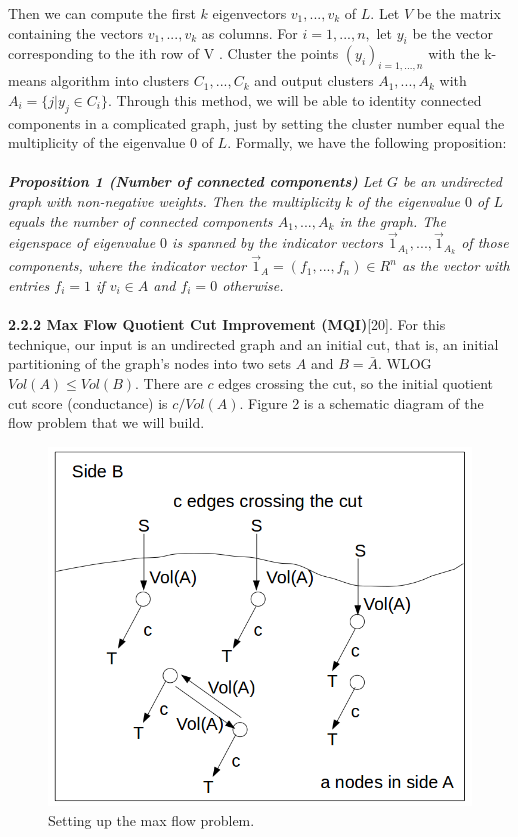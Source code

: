 \documentclass[12pt]{article}
\begin{document}
Then we can compute the first $k$ eigenvectors $v_1 , . . . , v_k$ of $L$. Let $V$
be the matrix containing the vectors $v_1 , . . . , v_k$ as columns. For $i=1, . . . ,n,$ let $y_i$ be the vector corresponding to the ith row of V . Cluster the points $(y_i)_{i=1,...,n}$ with the k-means algorithm into clusters $C_1 , . . . , C_k$ and output clusters $A_1 , . . . , A_k$ with $A_i = \{ j | y_j \in C_i \}$. Through this method, we will be able to identity connected components in a complicated graph, just by setting the cluster number equal the multiplicity of the eigenvalue $0$ of $L$. Formally, we have the following proposition:\\\\
\textit{\textbf{Proposition 1 (Number of connected components)} Let $G$ be an undirected graph with non-negative weights. Then the multiplicity $k$ of the eigenvalue $0$ of $L$ equals the number of connected components $A_1 ,..., A_k$ in the graph. The eigenspace of eigenvalue $0$ is spanned by the indicator vectors $\vec{1}_{A_1} ,...,\vec{1}_{A_k}$ of those components, where the indicator vector $\vec{1}_A = (f_1 ,..., f_n) \in R^n$ as the vector with entries $f_i = 1$ if $v_i \in A$ and $f_i = 0$ otherwise.}\\\\
\textbf{2.2.2 Max Flow Quotient Cut Improvement (MQI)}[20].
For this technique, our input is an undirected graph and an initial cut, that is, an initial partitioning of the graph’s nodes into two sets $A$ and $B = \bar{A}$. WLOG $Vol(A) \leq Vol(B)$. There are $c$ edges crossing the cut, so the initial quotient cut score (conductance) is $c/Vol(A)$. Figure 2 is a schematic diagram of the flow problem that we will build. \\
\begin{figure}[h]
\begin{center}
\includegraphics[scale=0.38]{MQI.png}  
\caption{Setting up the max flow problem.}
\end{center}
\end{figure}
\end{document}
